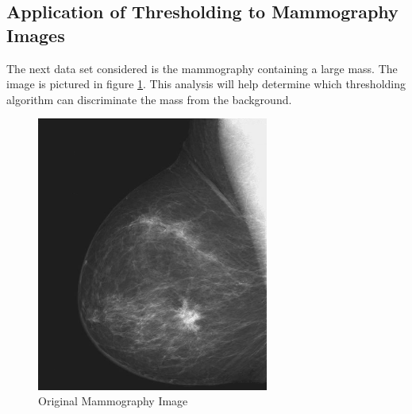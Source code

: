\documentclass[journal]{IEEEtran}
\begin{document}
\subsection{Application of Thresholding to Mammography Images}
\par The next data set considered is the mammography containing a large mass. The image is pictured in figure \ref{fig:breast}. This analysis will help determine which thresholding algorithm can discriminate the mass from the background.

\begin{figure}[!h]
\centering
\includegraphics[width=3in]{../images/breast.png}
\caption{Original Mammography Image}
\label{fig:breast}
\end{figure}
\end{document}
